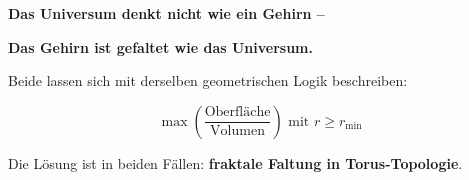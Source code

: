 	\begin{revolutionary}[Deutung]

		\begin{center}
			\textbf{Das Universum denkt nicht wie ein Gehirn --}

			\vspace{0.3cm}

			\textbf{Das Gehirn ist gefaltet wie das Universum.}
		\end{center}

		\normalsize

		\vspace{0.3cm}

		Beide lassen sich mit derselben geometrischen Logik beschreiben:

		\begin{equation}
			\boxed{\max\left(\frac{\text{Oberfläche}}{\text{Volumen}}\right) \text{ mit } r \geq r_{\min}}
		\end{equation}

		Die Lösung ist in beiden Fällen: \textbf{fraktale Faltung in Torus-Topologie}.
	\end{revolutionary}
